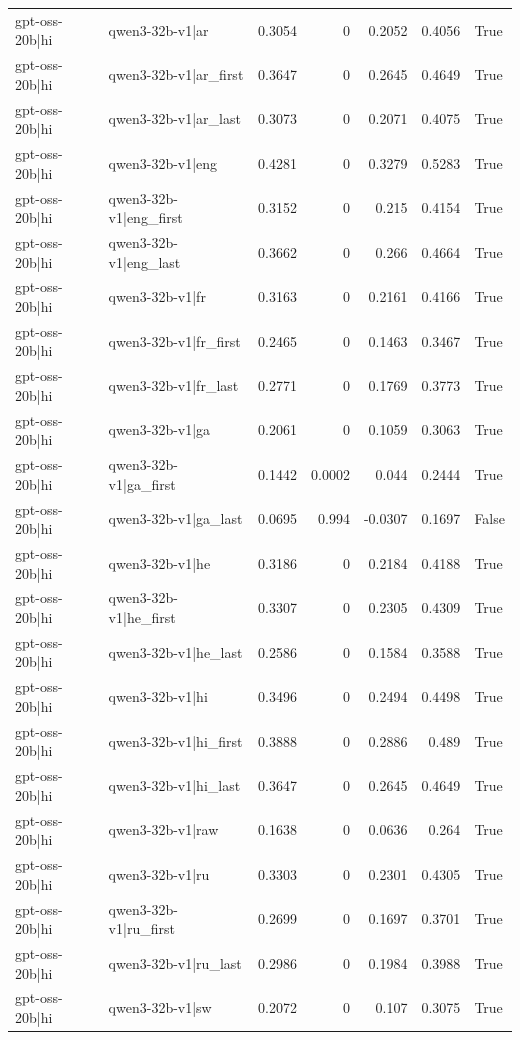 \begin{table}
\begin{tabular}{l l r r r r l}
gpt-oss-20b|hi & qwen3-32b-v1|ar & 0.3054 & 0 & 0.2052 & 0.4056 & True \\
gpt-oss-20b|hi & qwen3-32b-v1|ar_first & 0.3647 & 0 & 0.2645 & 0.4649 & True \\
gpt-oss-20b|hi & qwen3-32b-v1|ar_last & 0.3073 & 0 & 0.2071 & 0.4075 & True \\
gpt-oss-20b|hi & qwen3-32b-v1|eng & 0.4281 & 0 & 0.3279 & 0.5283 & True \\
gpt-oss-20b|hi & qwen3-32b-v1|eng_first & 0.3152 & 0 & 0.215 & 0.4154 & True \\
gpt-oss-20b|hi & qwen3-32b-v1|eng_last & 0.3662 & 0 & 0.266 & 0.4664 & True \\
gpt-oss-20b|hi & qwen3-32b-v1|fr & 0.3163 & 0 & 0.2161 & 0.4166 & True \\
gpt-oss-20b|hi & qwen3-32b-v1|fr_first & 0.2465 & 0 & 0.1463 & 0.3467 & True \\
gpt-oss-20b|hi & qwen3-32b-v1|fr_last & 0.2771 & 0 & 0.1769 & 0.3773 & True \\
gpt-oss-20b|hi & qwen3-32b-v1|ga & 0.2061 & 0 & 0.1059 & 0.3063 & True \\
gpt-oss-20b|hi & qwen3-32b-v1|ga_first & 0.1442 & 0.0002 & 0.044 & 0.2444 & True \\
gpt-oss-20b|hi & qwen3-32b-v1|ga_last & 0.0695 & 0.994 & -0.0307 & 0.1697 & False \\
gpt-oss-20b|hi & qwen3-32b-v1|he & 0.3186 & 0 & 0.2184 & 0.4188 & True \\
gpt-oss-20b|hi & qwen3-32b-v1|he_first & 0.3307 & 0 & 0.2305 & 0.4309 & True \\
gpt-oss-20b|hi & qwen3-32b-v1|he_last & 0.2586 & 0 & 0.1584 & 0.3588 & True \\
gpt-oss-20b|hi & qwen3-32b-v1|hi & 0.3496 & 0 & 0.2494 & 0.4498 & True \\
gpt-oss-20b|hi & qwen3-32b-v1|hi_first & 0.3888 & 0 & 0.2886 & 0.489 & True \\
gpt-oss-20b|hi & qwen3-32b-v1|hi_last & 0.3647 & 0 & 0.2645 & 0.4649 & True \\
gpt-oss-20b|hi & qwen3-32b-v1|raw & 0.1638 & 0 & 0.0636 & 0.264 & True \\
gpt-oss-20b|hi & qwen3-32b-v1|ru & 0.3303 & 0 & 0.2301 & 0.4305 & True \\
gpt-oss-20b|hi & qwen3-32b-v1|ru_first & 0.2699 & 0 & 0.1697 & 0.3701 & True \\
gpt-oss-20b|hi & qwen3-32b-v1|ru_last & 0.2986 & 0 & 0.1984 & 0.3988 & True \\
gpt-oss-20b|hi & qwen3-32b-v1|sw & 0.2072 & 0 & 0.107 & 0.3075 & True \\

\end{tabular}
\end{table}
